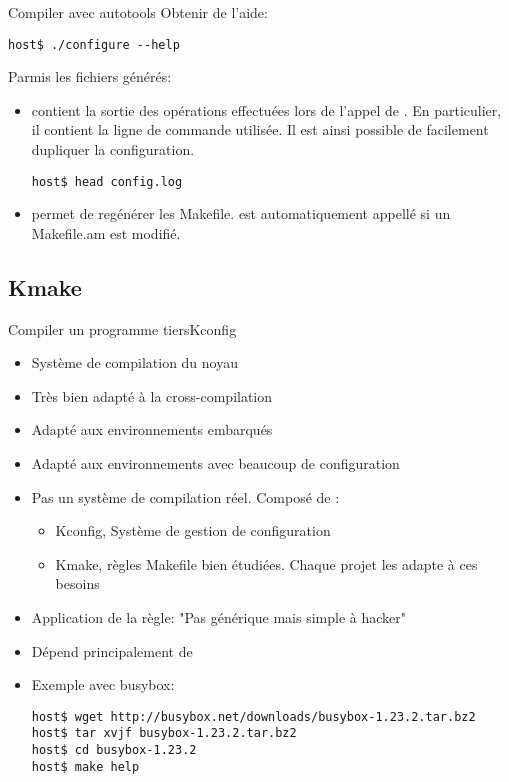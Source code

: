 \begin{frame}[fragile=singleslide]{Compiler avec autotools}
  Obtenir de l'aide:
\begin{lstlisting}
host$ ./configure --help
\end{lstlisting} %

  Parmis les fichiers générés:
  \begin{itemize}
  \item {}  contient la sortie  des opérations effectuées
    lors de l'appel de .  En particulier, il contient
    la ligne de commande utilisée. Il est ainsi possible de facilement
    dupliquer la configuration.
\begin{lstlisting}
host$ head config.log
\end{lstlisting} %
  \item     {}     permet     de    regénérer     les
    Makefile.   est  automatiquement appellé  si un
    Makefile.am est modifié.
  \end{itemize}
\end{frame}


\subsection{Kmake}

\begin{frame}[fragile=singleslide]{Compiler un programme tiers}{Kconfig}
  \begin{itemize}
  \item Système de compilation du noyau
  \item Très bien adapté à la cross-compilation
  \item Adapté aux environnements embarqués
  \item Adapté aux environnements avec beaucoup de configuration
  \item  Pas un  système de  compilation réel. Composé de :
    \begin{itemize}
    \item Kconfig, Système de gestion de configuration
    \item  Kmake, règles  Makefile  bien étudiées.  Chaque projet  les
      adapte à ces besoins
    \end{itemize}
  \item Application de la règle: "Pas générique mais simple à hacker"
  \item Dépend principalement de 
  \item Exemple avec busybox:
    \begin{lstlisting}
host$ wget http://busybox.net/downloads/busybox-1.23.2.tar.bz2
host$ tar xvjf busybox-1.23.2.tar.bz2
host$ cd busybox-1.23.2
host$ make help
    \end{lstlisting} %
  \end{itemize}
\end{frame}


